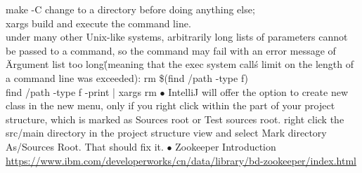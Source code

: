 make -C change to a directory before doing anything else;\\
xargs build and execute the command line.\\
under many other Unix-like systems, arbitrarily long lists of parameters cannot be passed to a command, so the command may fail with an error message of \"Argument list too long\" (meaning that the exec system call\'s limit on the length of a command line was exceeded): rm \$(find /path -type f)\\
find /path -type f -print | xargs rm
\bigskip\newline
$\bullet$   {\color{red}IntelliJ} will offer the option to create new class in the new menu, only if you right click within the part of your project structure, which is marked as Sources root or Test sources root.  right click the src/main directory in the project structure view and select Mark directory As/Sources Root. That should fix it.\bigskip
\newline
$\bullet$ {\color{green}Zookeeper Introduction} \url{https://www.ibm.com/developerworks/cn/data/library/bd-zookeeper/index.html}

